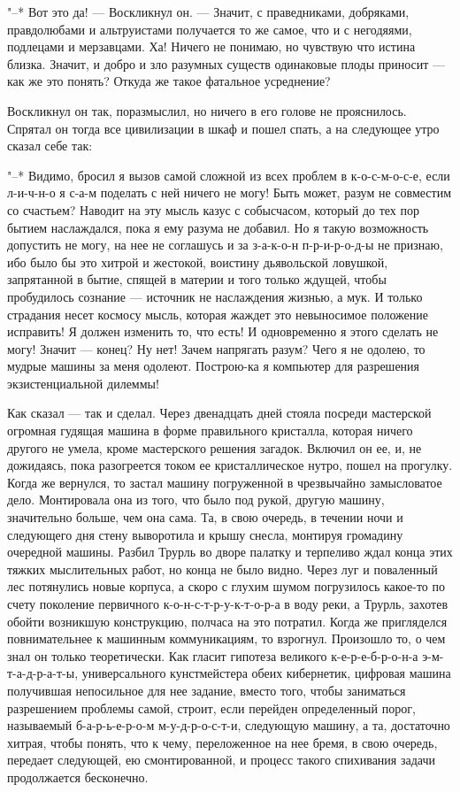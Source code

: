 "--* Вот это да! --- Воскликнул он. --- Значит, с
праведниками, добряками, правдолюбами и альтруистами
получается то же самое, что и с негодяями, подлецами и
мерзавцами. Ха! Ничего не понимаю, но чувствую что истина
близка. Значит, и добро и зло разумных существ одинаковые
плоды приносит --- как же это понять? Откуда же такое
фатальное усреднение?

Воскликнул он так, поразмыслил, но ничего в его голове не
прояснилось. Спрятал он тогда все цивилизации в шкаф и пошел
спать, а на следующее утро сказал себе так:

"--* Видимо, бросил я вызов самой сложной из всех проблем в
к-о-с-м-о-с-е, если л-и-ч-н-о я с-а-м поделать с ней ничего
не могу! Быть может, разум не совместим со счастьем? Наводит
на эту мысль казус с собысчасом, который до тех пор бытием
наслаждался, пока я ему разума не добавил. Но я такую
возможность допустить не могу, на нее не соглашусь и за
з-а-к-о-н п-р-и-р-о-д-ы не признаю, ибо было бы это хитрой и
жестокой, воистину дьявольской ловушкой, запрятанной в
бытие, спящей в материи и того только ждущей, чтобы
пробудилось сознание --- источник не наслаждения жизнью, а
мук. И только страдания несет космосу мысль, которая жаждет
это невыносимое положение исправить! Я должен изменить то,
что есть! И одновременно я этого сделать не могу! Значит --- конец?
Ну нет! Зачем напрягать разум? Чего я не одолею, то
мудрые машины за меня одолеют. Построю-ка я компьютер для
разрешения экзистенциальной дилеммы!

Как сказал --- так и сделал. Через двенадцать дней стояла
посреди мастерской огромная гудящая машина в форме
правильного кристалла, которая ничего другого не умела,
кроме мастерского решения загадок. Включил он ее, и, не
дожидаясь, пока разогреется током ее кристаллическое нутро,
пошел на прогулку. Когда же вернулся, то застал машину
погруженной в чрезвычайно замысловатое дело. Монтировала она
из того, что было под рукой, другую машину, значительно
больше, чем она сама. Та, в свою очередь, в течении ночи и
следующего дня стену выворотила и крышу снесла, монтируя
громадину очередной машины. Разбил Трурль во дворе палатку и
терпеливо ждал конца этих тяжких мыслительных работ, но
конца не было видно. Через луг и поваленный лес потянулись
новые корпуса, а скоро с глухим шумом погрузилось какое-то
по счету поколение первичного к-о-н-с-т-р-у-к-т-о-р-а в воду
реки, а Трурль, захотев обойти возникшую конструкцию,
полчаса на это потратил. Когда же пригляделся повнимательнее
к машинным коммуникациям, то взрогнул. Произошло то, о чем
знал он только теоретически. Как гласит гипотеза великого
к-е-р-е-б-р-о-н-а э-м-т-а-д-р-а-т-ы, универсального
кунстмейстера обеих кибернетик, цифровая машина получившая
непосильное для нее задание, вместо того, чтобы заниматься
разрешением проблемы самой, строит, если перейден
определенный порог, называемый б-а-р-ь-е-р-о-м
м-у-д-р-о-с-т-и, следующую машину, а та, достаточно хитрая,
чтобы понять, что к чему, переложенное на нее бремя, в свою
очередь, передает следующей, ею смонтированной, и процесс
такого спихивания задачи продолжается бесконечно.

